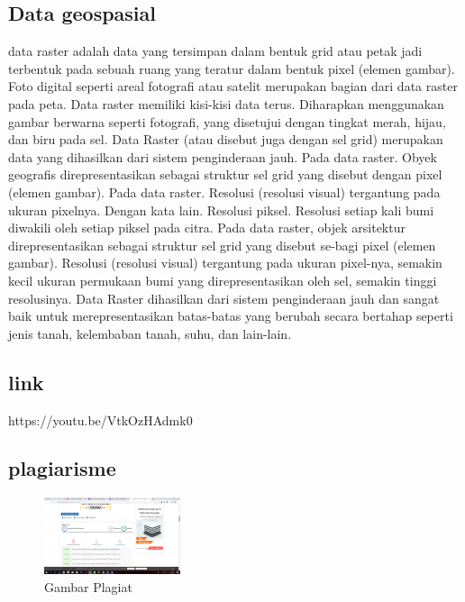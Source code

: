 \subsection{Data geospasial}
data raster adalah data yang tersimpan dalam bentuk grid atau petak jadi terbentuk pada sebuah ruang yang teratur dalam bentuk pixel (elemen gambar).  Foto digital seperti areal fotografi atau satelit merupakan bagian dari data raster pada peta.  Data raster memiliki kisi-kisi data terus. Diharapkan menggunakan gambar berwarna seperti fotografi, yang disetujui dengan tingkat merah, hijau, dan biru pada sel.  Data Raster (atau disebut juga dengan sel grid) merupakan data yang dihasilkan dari sistem penginderaan jauh.  Pada data raster.  Obyek geografis direpresentasikan sebagai struktur sel grid yang disebut dengan pixel (elemen gambar).  Pada data raster.  Resolusi (resolusi visual) tergantung pada ukuran pixelnya.  Dengan kata lain.  Resolusi piksel. Resolusi setiap kali bumi diwakili oleh setiap piksel pada citra.  Pada data raster, objek arsitektur direpresentasikan sebagai struktur sel grid yang disebut se-bagi pixel (elemen gambar).  Resolusi (resolusi visual) tergantung pada ukuran pixel-nya, semakin kecil ukuran permukaan bumi yang direpresentasikan oleh sel, semakin tinggi resolusinya.  Data Raster dihasilkan dari sistem penginderaan jauh dan sangat baik untuk merepresentasikan batas-batas yang berubah secara bertahap seperti jenis tanah, kelembaban tanah, suhu, dan lain-lain.
\subsection{link}
https://youtu.be/VtkOzHAdmk0
\subsection{plagiarisme}
\begin{figure}[H]
 \includegraphics[width=4cm]{figures/Tugas1/1174073/plagiarism.png}
 \centering
 \caption{Gambar Plagiat}
\end{figure}